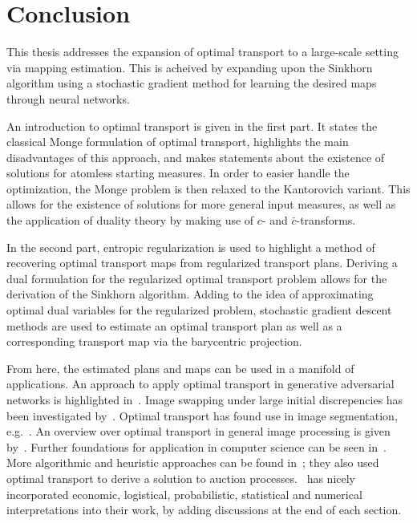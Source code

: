 \chapter*{Conclusion}

This thesis addresses the expansion of optimal transport to a large-scale setting via mapping estimation. This is acheived by expanding upon the Sinkhorn algorithm using a stochastic gradient method for learning the desired maps through neural networks.

An introduction to optimal transport is given in the first part. It states the classical Monge formulation of optimal transport, highlights the main disadvantages of this approach, and makes statements about the existence of solutions for atomless starting measures. In order to easier handle the optimization, the Monge problem is then relaxed to the Kantorovich variant. This allows for the existence of solutions for more general input measures, as well as the application of duality theory by making use of $c$- and $\bar{c}$-transforms.

In the second part, entropic regularization is used to highlight a method of recovering optimal transport maps from regularized transport plans. Deriving a dual formulation for the regularized optimal transport problem allows for the derivation of the Sinkhorn algorithm. Adding to the idea of approximating optimal dual variables for the regularized problem, stochastic gradient descent methods are used to estimate an optimal transport plan as well as a corresponding transport map via the barycentric projection.

From here, the estimated plans and maps can be used in a manifold of applications. An approach to apply optimal transport in generative adversarial networks is highlighted in\ \cite{Sal2018}. Image swapping under large initial discrepencies has been investigated by\ \cite{Zhu2020}. Optimal transport has found use in image segmentation, e.g.\ \cite{Rabin2015}. An overview over optimal transport in general image processing is given by\ \cite{Papa2015}. Further foundations for application in computer science can be seen in\ \cite{Levy2017}. More algorithmic and heuristic approaches can be found in~\cite{Pey2019}; they also used optimal transport to derive a solution to auction processes.\ \cite{San2015} has nicely incorporated economic, logistical, probabilistic, statistical and numerical interpretations into their work, by adding discussions at the end of each section.

